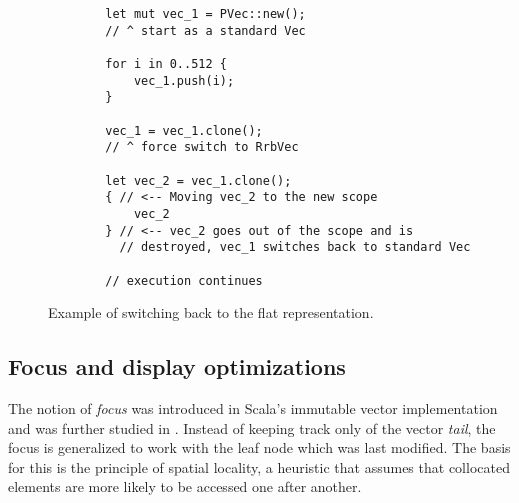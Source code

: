 \begin{figure}[!htbp] 
    \centering

    \begin{verbatim}
        let mut vec_1 = PVec::new();
        // ^ start as a standard Vec

        for i in 0..512 {
            vec_1.push(i);            
        }

        vec_1 = vec_1.clone();
        // ^ force switch to RrbVec

        let vec_2 = vec_1.clone();
        { // <-- Moving vec_2 to the new scope
            vec_2
        } // <-- vec_2 goes out of the scope and is 
          // destroyed, vec_1 switches back to standard Vec           

        // execution continues
    \end{verbatim}

    \caption{Example of switching back to the flat representation.}
    \label{fig:switching-to-flat}
\end{figure}





\subsection{Focus and display optimizations}
The notion of \emph{focus} was introduced in Scala's immutable vector implementation and was further studied in \cite{rrb-vector-practical-general-purpose-im-sequence}. Instead of keeping track only of the vector \emph{tail}, the focus is generalized to work with the leaf node which was last modified. The basis for this is the principle of spatial locality, a heuristic that assumes that collocated elements are more likely to be accessed one after another.

